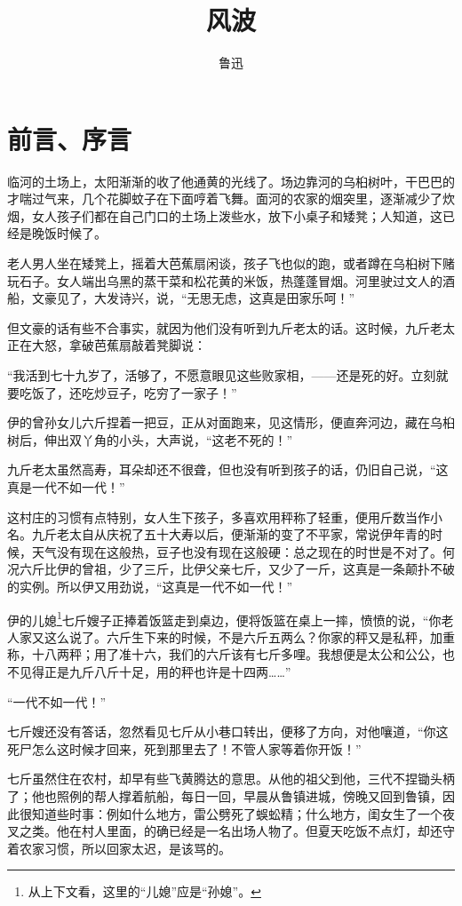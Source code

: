 \documentclass[12pt,UTF8]{ctexbook}
\title{\heiti\zihao{0} 风波}
\author{鲁迅}
\date{}
\begin{document}
\maketitle
\tableofcontents

\frontmatter
\chapter{前言、序言}

\mainmatter

临河的土场上，太阳渐渐的收了他通黄的光线了。场边靠河的乌桕树叶，干巴巴的才喘过气来，几个花脚蚊子在下面哼着飞舞。面河的农家的烟突里，逐渐减少了炊烟，女人孩子们都在自己门口的土场上泼些水，放下小桌子和矮凳；人知道，这已经是晚饭时候了。

老人男人坐在矮凳上，摇着大芭蕉扇闲谈，孩子飞也似的跑，或者蹲在乌桕树下赌玩石子。女人端出乌黑的蒸干菜和松花黄的米饭，热蓬蓬冒烟。河里驶过文人的酒船，文豪见了，大发诗兴，说，“无思无虑，这真是田家乐呵！”

但文豪的话有些不合事实，就因为他们没有听到九斤老太的话。这时候，九斤老太正在大怒，拿破芭蕉扇敲着凳脚说：

“我活到七十九岁了，活够了，不愿意眼见这些败家相，——还是死的好。立刻就要吃饭了，还吃炒豆子，吃穷了一家子！”

伊的曾孙女儿六斤捏着一把豆，正从对面跑来，见这情形，便直奔河边，藏在乌桕树后，伸出双丫角的小头，大声说，“这老不死的！”

九斤老太虽然高寿，耳朵却还不很聋，但也没有听到孩子的话，仍旧自己说，“这真是一代不如一代！”

这村庄的习惯有点特别，女人生下孩子，多喜欢用秤称了轻重，便用斤数当作小名。九斤老太自从庆祝了五十大寿以后，便渐渐的变了不平家，常说伊年青的时候，天气没有现在这般热，豆子也没有现在这般硬：总之现在的时世是不对了。何况六斤比伊的曾祖，少了三斤，比伊父亲七斤，又少了一斤，这真是一条颠扑不破的实例。所以伊又用劲说，“这真是一代不如一代！”

伊的儿媳\footnote{从上下文看，这里的“儿媳”应是“孙媳”。}七斤嫂子正捧着饭篮走到桌边，便将饭篮在桌上一摔，愤愤的说，“你老人家又这么说了。六斤生下来的时候，不是六斤五两么？你家的秤又是私秤，加重称，十八两秤；用了准十六，我们的六斤该有七斤多哩。我想便是太公和公公，也不见得正是九斤八斤十足，用的秤也许是十四两……”

“一代不如一代！”

七斤嫂还没有答话，忽然看见七斤从小巷口转出，便移了方向，对他嚷道，“你这死尸怎么这时候才回来，死到那里去了！不管人家等着你开饭！”

七斤虽然住在农村，却早有些飞黄腾达的意思。从他的祖父到他，三代不捏锄头柄了；他也照例的帮人撑着航船，每日一回，早晨从鲁镇进城，傍晚又回到鲁镇，因此很知道些时事：例如什么地方，雷公劈死了蜈蚣精；什么地方，闺女生了一个夜叉之类。他在村人里面，的确已经是一名出场人物了。但夏天吃饭不点灯，却还守着农家习惯，所以回家太迟，是该骂的。
\end{document}

